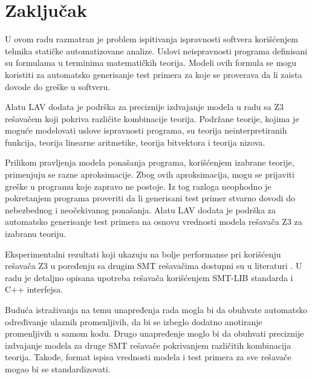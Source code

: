 \documentclass[12pt,oneside]{memoir}
\begin{document}
\chapter{Zaključak} \label{zakljucak}
U ovom radu razmatran je problem ispitivanja ispravnosti softvera korišćenjem tehnika statičke automatizovane analize. 
Uslovi neispravnosti programa definisani su formulama u terminima matematičkih teorija. Modeli ovih formula se mogu koristiti za automatsko generisanje test primera za koje se proverava da li zaista dovode do greške u softveru.
\par
Alatu LAV dodata je podrška za preciznije izdvajanje modela u radu sa Z3 rešavačem
koji pokriva različite kombinacije teorija. Podržane teorije, kojima je moguće modelovati uslove ispravnosti programa, su teorija neinterpretiranih funkcija, teorija linearne aritmetike,
teorija bitvektora i teorija nizova.

Prilikom pravljenja modela ponašanja programa, korišćenjem izabrane teorije,
primenjuju se razne aproksimacije. 
Zbog ovih aproksimacija, mogu se prijaviti greške u programu koje zapravo ne postoje. Iz tog razloga neophodno je pokretanjem
programa proveriti da li generisani test primer stvarno dovodi do nebezbednog i
neočekivanog ponašanja. Alatu LAV dodata je podrška za automatsko
generisanje test primera na osnovu vrednosti modela rešavača Z3 za izabranu
teoriju.
 
Eksperimentalni rezultati koji ukazuju na bolje performanse pri korišćenju rešavača Z3 u poređenju sa drugim SMT rešavačima dostupni su u literaturi \cite{z3improvements}. U radu je detaljno opisana upotreba rešavača korišćenjem SMT-LIB standarda i C++ interfejsa.

Buduća istraživanja na temu unapređenja rada mogla bi da obuhvate automatsko određivanje ulaznih promenljivih, da bi se izbeglo dodatno anotiranje promenljivih u samom kodu. Drugo unapređenje moglo bi da obuhvati preciznije izdvajanje modela za druge SMT rešavače pokrivanjem različitih kombinacija teorija. Takođe, format ispisa vrednosti modela i test primera za sve rešavače mogao bi se standardizovati. 


\literatura

\backmatter

\end{document}
